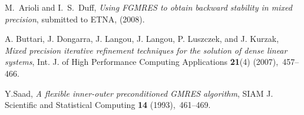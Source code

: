 \documentclass{report}
\begin{document}
\begin{thebibliography}{10}

{\sc M.~Arioli and I.~S.~Duff},
{\em Using FGMRES to obtain backward stability in mixed precision},
submitted to ETNA, (2008).

{\sc A. Buttari, J. Dongarra, J. Langou, J. Langou, P. Luszczek, and J. Kurzak},
{\em Mixed precision iterative refinement techniques for the solution of
dense linear systems}, Int. J. of High Performance Computing
Applications {\bf 21}(4) (2007),~457--466.

{\sc Y.Saad}, {\em A flexible inner-outer preconditioned {GMRES} algorithm},
SIAM J. Scientific and Statistical Computing {\bf 14} (1993),~461--469.


\end{thebibliography}
\end{document}
